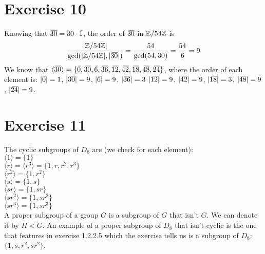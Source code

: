 \documentclass[12pt]{article}
\begin{document}
    \section*{Exercise 10}
    Knowing that $\,\overline{\!{30}} = 30 \cdot \,\overline{\!{1}}$,
    the order of $\,\overline{\!{30}}$ in $\mathbb{Z}/54\mathbb{Z}$ is
    \[ \dfrac{|\mathbb{Z}/54\mathbb{Z}|}{\gcd(|\mathbb{Z}/54\mathbb{Z}|, |\,\overline{\!{30}}|)}
    = \dfrac{54}{\gcd(54, 30)} 
    = \dfrac{54}{6}
    = 9 \]
    We know that $\langle \olsi{30} \rangle
    = \{ \olsi{0}, \olsi{30}, \olsi{6}, \olsi{36}, \olsi{12}, 
    \olsi{42}, \olsi{18}, \olsi{48}, \olsi{24}\}$,
    where the order of each element is: $|\,\overline{\!{0}}| = 1$,
    $|\,\overline{\!{30}}| = 9$, $|\,\overline{\!{6}}| = 9$, $|\,\overline{\!{36}}| = 3$
    $|\,\overline{\!{12}}| = 9$, $|\,\overline{\!{42}}| = 9$, $|\,\overline{\!{18}}| = 3$,
    $|\,\overline{\!{48}}| = 9$, $|\,\overline{\!{24}}| = 9$.


    \section*{Exercise 11}
    The cyclic subgroups of $D_8$ are (we check for each element): \\
    $\langle 1 \rangle = \{1\}$ \\
    $\langle r \rangle = \langle r^3 \rangle = \{1, r, r^2, r^3\}$ \\
    $\langle r^2 \rangle = \{1, r^2\}$ \\
    $\langle s \rangle = \{1, s\}$ \\
    $\langle sr \rangle = \{1, sr\}$ \\
    $\langle sr^2 \rangle = \{1, sr^2\}$ \\
    $\langle sr^3 \rangle = \{1, sr^3\}$ \\
    A proper subgroup of a group $G$ is a subgroup of $G$ that isn't $G$.
    We can denote it by $H < G$.
    An example of a proper subgroup of $D_8$
    that isn't cyclic is the one that features in exercise 1.2.2.5
    which the exercise tells us is a subgroup of $D_8$:
    $\{1, s, r^2, sr^2\}$.
\end{document}
